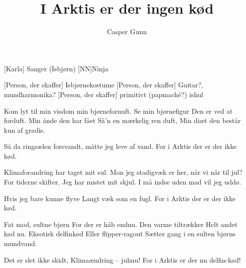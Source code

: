 \documentclass[a4paper,11pt]{article}
\title{I Arktis er der ingen kød}
\author{Casper Gunn}
\begin{document}
\maketitle

\begin{roles}
    [Karla] Sanger (Isbjørn)
    [NN]Ninja
\end{roles}

\begin{props}
    [Person, der skaffer] Isbjørnekostume 
    [Person, der skaffer] Guitar?, mundharmonika?
    [Person, der skaffer] primitivt (papmaché?) ishul
\end{props}

\begin{song}
Kom lyt til min visdom
min bjørnefornuft.
Se min bjørnefigur
Den er ved at forduft.
Min ånde den har fået
Så’n en mærkelig ren duft,
Min diæt den består kun af grødis.

Så da ringsælen forsvandt,
måtte jeg leve af vand.
For i Arktis der er der ikke kød.

Klimaforandring
har taget mit sul.
Mon jeg stadigvæk er her,
når vi når til jul?
For tiderne skifter,
Jeg har mistet mit skjul.
I må indse uden mad vil jeg uddø.

Hvis jeg bare kunne flyve
Langt væk som en fugl.
For i Arktis der er der ikke kød.

Fat mod, sultne bjørn
For der er håb endnu.
Den varme tiltrækker 
Helt andet kød nu.
Eksotisk delfinkød
Eller flipper-ragout
Sætter gang i en sulten bjørns mundvand.

Det er slet ikke skidt,
Klimaændring – juhuu!
For i Arktis er der nu delfin-kød!


\end{song}
\end{document}
